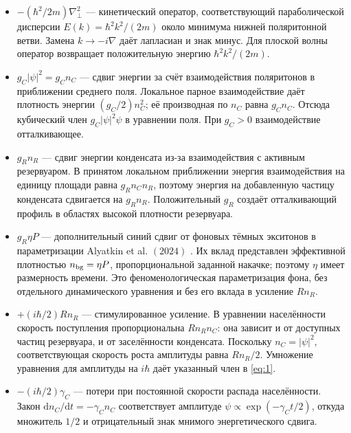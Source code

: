 \documentclass[12pt,a4paper]{article}
\begin{document}
\begin{itemize}\raggedright\setlength{\itemsep}{3pt}\setlength{\parsep}{0pt}

\item $-(\hbar^{2}/2m) \nabla_{\perp}^{2}$ --- кинетический оператор, соответствующий параболической дисперсии $E(k)=\hbar^{2} k^{2}/(2m)$ около минимума нижней поляритонной ветви. Замена $k\to -i \nabla$ даёт лапласиан и знак минус. Для плоской волны оператор возвращает положительную энергию $\hbar^{2} k^{2}/(2m)$.

\item $g_{C}|\psi|^{2}=g_{C} n_{C}$ --- сдвиг энергии за счёт взаимодействия поляритонов в приближении среднего поля. Локальное парное взаимодействие даёт плотность энергии $(g_{C}/2)n_{C}^{2}$; её производная по $n_{C}$ равна $g_{C} n_{C}$. Отсюда кубический член $g_{C}|\psi|^{2} \psi$ в уравнении поля. При $g_{C}>0$ взаимодействие отталкивающее.

\item $g_{R} n_{R}$ --- сдвиг энергии конденсата из-за взаимодействия с активным резервуаром. В принятом локальном приближении энергия взаимодействия на единицу площади равна $g_{R} n_{C} n_{R}$, поэтому энергия на добавленную частицу конденсата сдвигается на $g_{R} n_{R}$. Положительный $g_{R}$ создаёт отталкивающий профиль в областях высокой плотности резервуара.

\item $g_{R} \eta P$ --- дополнительный синий сдвиг от фоновых тёмных экситонов в параметризации Alyatkin et al. $(2024)$ \cite{ref3}. Их вклад представлен эффективной плотностью $n_{\rm bg}=\eta P$, пропорциональной заданной накачке; поэтому $\eta$ имеет размерность времени. Это феноменологическая параметризация фона, без отдельного динамического уравнения и без его вклада в усиление $R n_{R}$.

\item $+(i \hbar/2)R n_{R}$ --- стимулированное усиление. В уравнении населённости скорость поступления пропорциональна $R n_{R} n_{C}$: она зависит и от доступных частиц резервуара, и от заселённости конденсата. Поскольку $n_{C}=|\psi|^{2}$, соответствующая скорость роста амплитуды равна $R n_{R}/2$. Умножение уравнения для амплитуды на $i \hbar$ даёт указанный член в \eqref{eq:1}.

\item $-(i \hbar/2)\gamma_{C}$ --- потери при постоянной скорости распада населённости. Закон $\mathrm d n_{C}/\mathrm dt=-\gamma_{C} n_{C}$ соответствует амплитуде $\psi\propto \exp(-\gamma_{C} t/2)$, откуда множитель $1/2$ и отрицательный знак мнимого энергетического сдвига.

\end{itemize}
\end{document}
